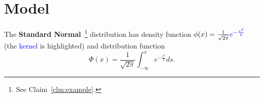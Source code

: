 
\section{Model}

The \textbf{Standard Normal}~\footnote{See Claim~\ref{clm:example}.} distribution has density function \( \phi(x) = \frac{1}{\sqrt{2 \pi}} \textcolor{blue}{e^{-\frac{x^2}{2}}} \) (the \textcolor{blue}{kernel} is highlighted) and distribution function
\[
	\Phi(x) = \frac{1}{\sqrt{2 \pi}} \int_{-\infty}^x e^{-\frac{s^2}{2}}ds.
\]

\begin{comment}
This is a multiline or block comment.
The `comment` environment is provided by the `verbatim` package.

All this stuff is just ignored.
\end{comment}
